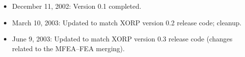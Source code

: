 \documentclass[11pt]{article}
\begin{document}
\begin{itemize}

  \item December 11, 2002: Version 0.1 completed.

  \item March 10, 2003: Updated to match XORP version 0.2 release code;
  cleanup.

  \item June 9, 2003: Updated to match XORP version 0.3 release code
  (changes related to the MFEA--FEA merging).

\end{itemize}





\end{document}
